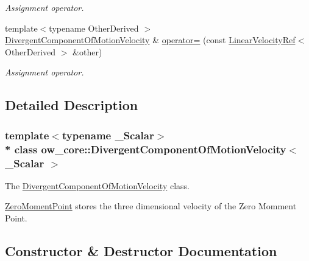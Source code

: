 \begin{DoxyCompactItemize}
\begin{DoxyCompactList}\small\item\em Assignment operator. \end{DoxyCompactList}\item 
{\footnotesize template$<$typename Other\+Derived $>$ }\\\hyperlink{classow__core_1_1DivergentComponentOfMotionVelocity}{Divergent\+Component\+Of\+Motion\+Velocity} \& \hyperlink{classow__core_1_1DivergentComponentOfMotionVelocity_ae407a92f8ae2de30efcb19c09bc2cf5f}{operator=} (const \hyperlink{classow__core_1_1LinearVelocityRef}{Linear\+Velocity\+Ref}$<$ Other\+Derived $>$ \&other)\hypertarget{classow__core_1_1DivergentComponentOfMotionVelocity_ae407a92f8ae2de30efcb19c09bc2cf5f}{}\label{classow__core_1_1DivergentComponentOfMotionVelocity_ae407a92f8ae2de30efcb19c09bc2cf5f}

\begin{DoxyCompactList}\small\item\em Assignment operator. \end{DoxyCompactList}\end{DoxyCompactItemize}


\subsection{Detailed Description}
\subsubsection*{template$<$typename \+\_\+\+Scalar$>$\\*
class ow\+\_\+core\+::\+Divergent\+Component\+Of\+Motion\+Velocity$<$ \+\_\+\+Scalar $>$}

The \hyperlink{classow__core_1_1DivergentComponentOfMotionVelocity}{Divergent\+Component\+Of\+Motion\+Velocity} class. 

\hyperlink{classow__core_1_1ZeroMomentPoint}{Zero\+Moment\+Point} stores the three dimensional velocity of the Zero Momment Point. 

\subsection{Constructor \& Destructor Documentation}
